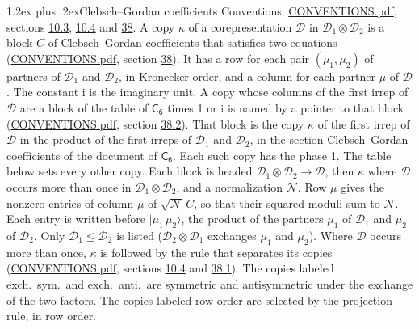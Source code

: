 \documentclass[10pt,a4paper]{article}
\makeatletter
\renewcommand\section{\@startsection{section}{1}{\z@}{-3ex plus -1ex minus -.2ex}%
  {1.2ex plus .2ex}{\normalfont\large\sffamily\bfseries\color{parttitle}}}
\numberwithin{equation}{section}
\newcommand{\grp}[1]{\mathsf{#1}}
\newcommand{\iunit}{\mathrm{i}}
\newcommand{\irrprod}{\otimes}
\newcommand{\mult}{\kappa}
\newcommand{\intx}{\mu}
\newcommand{\cgnorm}{\mathcal{N}}
\newcommand{\prodket}[2]{\lvert {#1}\,{#2}\rangle}
\makeatother
\begin{document}
\section{Clebsch--Gordan coefficients}\label{s:clebsch_gordan}
Conventions: \href{../../CONVENTIONS.pdf}{CONVENTIONS.pdf}, sections \href{../../../rotation/CONVENTIONS.pdf\#conv.10.3}{10.3}, \href{../../../rotation/CONVENTIONS.pdf\#conv.10.4}{10.4} and \href{../../CONVENTIONS.pdf\#conv.38}{38}.
\leavevmode\label{n:index.copy}\label{n:matrix.cg.stored}A copy $\mult$ of a corepresentation $\mathcal{D}$ in $\mathcal{D}_1\irrprod\mathcal{D}_2$ is a block $C$ of Clebsch--Gordan coefficients that satisfies two equations (\href{../../CONVENTIONS.pdf}{CONVENTIONS.pdf}, section \href{../../CONVENTIONS.pdf\#conv.38}{38}). \label{n:index.cg}It has a row for each pair $(\intx_1, \intx_2)$ of partners of $\mathcal{D}_1$ and $\mathcal{D}_2$, in Kronecker order, and a column for each partner $\intx$ of $\mathcal{D}$.
The constant $\iunit$ is the imaginary unit.
A copy whose columns of the first irrep of $\mathcal{D}$ are a block of the table of $\grp{C_{6}}$ times 1 or $\iunit$ is named by a pointer to that block (\href{../../CONVENTIONS.pdf}{CONVENTIONS.pdf}, section \href{../../CONVENTIONS.pdf\#conv.38.2}{38.2}). That block is the copy $\mult$ of the first irrep of $\mathcal{D}$ in the product of the first irreps of $\mathcal{D}_1$ and $\mathcal{D}_2$, in the section Clebsch--Gordan coefficients of the document of \href{../../../rotation/data/pdf/C6.pdf}{$\grp{C_{6}}$}. Each such copy has the phase 1. The table below sets every other copy.
Each block is headed $\mathcal{D}_1\irrprod\mathcal{D}_2\to\mathcal{D}$, then $\mult$ where $\mathcal{D}$ occurs more than once in $\mathcal{D}_1\irrprod\mathcal{D}_2$, and a normalization $\cgnorm$. Row $\intx$ gives the nonzero entries of column $\intx$ of $\sqrt{\cgnorm}\,C$, so that their squared moduli sum to $\cgnorm$. \label{n:vector.ket.product}Each entry is written before $\prodket{\intx_1}{\intx_2}$, the product of the partners $\intx_1$ of $\mathcal{D}_1$ and $\intx_2$ of $\mathcal{D}_2$. Only $\mathcal{D}_1 \le \mathcal{D}_2$ is listed ($\mathcal{D}_2\irrprod\mathcal{D}_1$ exchanges $\intx_1$ and $\intx_2$).
Where $\mathcal{D}$ occurs more than once, $\mult$ is followed by the rule that separates its copies (\href{../../CONVENTIONS.pdf}{CONVENTIONS.pdf}, sections \href{../../../rotation/CONVENTIONS.pdf\#conv.10.4}{10.4} and \href{../../CONVENTIONS.pdf\#conv.38.1}{38.1}). \label{n:abbreviation.exchange}The copies labeled exch.\ sym.\ and exch.\ anti.\ are symmetric and antisymmetric under the exchange of the two factors. The copies labeled row order are selected by the projection rule, in row order.
\end{document}
